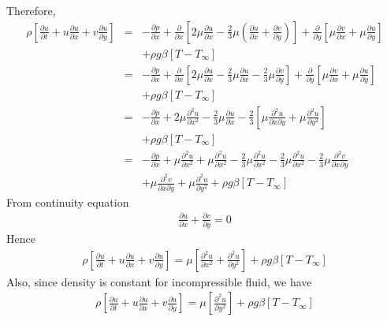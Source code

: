 \documentclass[11pt]{report}
\newcommand{\spn}[1]{\\[#1cm]}
\newcommand{\NI}{\noindent}
\begin{document}
	\NI Therefore,
	\begin{eqnarray*}
		\rho\left[\frac{\partial u}{\partial t} + u\frac{\partial u}{\partial x}+ v\frac{\partial u}{\partial y}\right] &=& - \frac{\partial p}{\partial x} + \frac{\partial}{\partial x}\left[2\mu\frac{\partial u}{\partial x} - \frac{2}{3}\mu\left(\frac{\partial u}{\partial x} +\frac{\partial v}{\partial y}\right)\right] + \frac{\partial}{\partial y}\left[\mu\frac{\partial v}{\partial x} + \mu\frac{\partial u}{\partial y}\right] \\
		&&+ \rho g\beta[T-T_\infty]\spn{0.5}
		&=& - \frac{\partial p}{\partial x}+\frac{\partial}{\partial x}\left[2\mu\frac{\partial u}{\partial x} - \frac{2}{3}\mu\frac{\partial u}{\partial x} - \frac{2}{3}\mu\frac{\partial v}{\partial y}\right] + \frac{\partial}{\partial y}\left[\mu\frac{\partial v}{\partial x}+\mu\frac{\partial u}{\partial y}\right] \\
		&&+ \rho g\beta[T-T_\infty]\spn{0.5}
		&=&-\frac{\partial p}{\partial x} + 2\mu\frac{\partial^2 u}{\partial x^2} - \frac{2}{3}\mu\frac{\partial u}{\partial x} - \frac{2}{3}\left[\mu\frac{\partial^2 u}{\partial x \partial y} + \mu \frac{\partial^2 u}{\partial y^2}\right] \\
		&&+ \rho g\beta[T-T_\infty]\spn{0.5}
		&=& - \frac{\partial p}{\partial x} + \mu\frac{\partial^2 u}{\partial x^2} + \mu\frac{\partial^2 u}{\partial x^2} - \frac{2}{3}\mu\frac{\partial^2 u}{\partial x^2} - \frac{2}{3}\mu\frac{\partial^2 u}{\partial x^2} - \frac{2}{3}\mu\frac{\partial^2 v}{\partial x \partial y} \\
		&&+ \mu\frac{\partial^2 v}{\partial x \partial y} + \mu\frac{\partial^2 u}{\partial y^2} + \rho g\beta[T-T_\infty]
	\end{eqnarray*}
	From continuity equation
	\begin{eqnarray*}
		\frac{\partial u}{\partial x} + \frac{\partial v}{\partial y} = 0
	\end{eqnarray*}
	Hence
	\begin{eqnarray}
		\rho\left[\frac{\partial u}{\partial t} + u\frac{\partial u}{\partial x}+ v\frac{\partial u}{\partial y}\right] = \mu\left[\frac{\partial^2 u}{\partial x^2}+\frac{\partial^2 u}{\partial y^2}\right]+ \rho g\beta[T-T_\infty]
	\end{eqnarray}
	Also, since density is constant for incompressible fluid, we have
	\begin{eqnarray}
			\rho\left[\frac{\partial u}{\partial t} + u\frac{\partial u}{\partial x}+ v\frac{\partial u}{\partial y}\right] = \mu\left[\frac{\partial^2 u}{\partial y^2}\right]+ \rho g\beta[T-T_\infty]
	\end{eqnarray}
\end{document}
